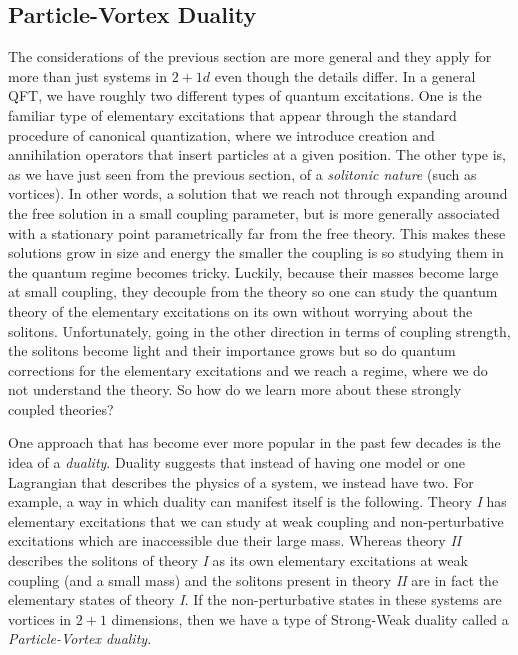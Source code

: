     \subsection{Particle-Vortex Duality}
    The considerations of the previous section are more general and they apply for more than just systems in $2+1d$ even though the details differ. In a general QFT, we have roughly two different types of quantum excitations. One is the familiar type of elementary excitations that appear through the standard procedure of canonical quantization, where we introduce creation and annihilation operators that insert particles at a given position. The other type is, as we have just seen from the previous section, of a \textit{solitonic nature} (such as vortices). In other words, a solution that we reach not through expanding around the free solution in a small coupling parameter, but is more generally associated with a stationary point parametrically far from the free theory. This makes these solutions grow in size and energy the smaller the coupling is so studying them in the quantum regime becomes tricky. Luckily, because their masses become large at small coupling, they decouple from the theory so one can study the quantum theory of the elementary excitations on its own without worrying about the solitons. Unfortunately, going in the other direction in terms of coupling strength, the solitons become light and their importance grows but so do quantum corrections for the elementary excitations and we reach a regime, where we do not understand the theory. So how do we learn more about these strongly coupled theories?

    One approach that has become ever more popular in the past few decades is the idea of a \textit{duality}. Duality suggests that instead of having one model or one Lagrangian that describes the physics of a system, we instead have two. For example, a way in which duality can manifest itself is the following. Theory \textit{I} has elementary excitations that we can study at weak coupling and non-perturbative excitations which are inaccessible due their large mass. Whereas theory \textit{II} describes the solitons of theory \textit{I} as its own elementary excitations at weak coupling (and a small mass) and the solitons present in theory \textit{II} are in fact the elementary states of theory \textit{I}. If the non-perturbative states in these systems are vortices in $2+1$ dimensions, then we have a type of Strong-Weak duality called a \textit{Particle-Vortex duality}. 

